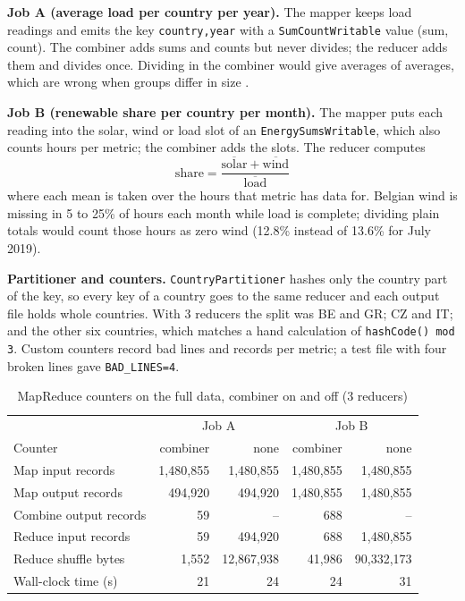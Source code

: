 \documentclass[12pt,a4paper]{report}
\begin{document}
\textbf{Job A (average load per country per year).} The mapper keeps load readings and emits the key \texttt{country,year} with a \texttt{SumCountWritable} value (sum, count). The combiner adds sums and counts but never divides; the reducer adds them and divides once. Dividing in the combiner would give averages of averages, which are wrong when groups differ in size \cite{lin2010}.

\textbf{Job B (renewable share per country per month).} The mapper puts each reading into the solar, wind or load slot of an \texttt{EnergySumsWritable}, which also counts hours per metric; the combiner adds the slots. The reducer computes
\[ \text{share} = \frac{\overline{\text{solar}} + \overline{\text{wind}}}{\overline{\text{load}}} \]
where each mean is taken over the hours that metric has data for. Belgian wind is missing in 5 to 25\% of hours each month while load is complete; dividing plain totals would count those hours as zero wind (12.8\% instead of 13.6\% for July 2019).

\textbf{Partitioner and counters.} \texttt{CountryPartitioner} hashes only the country part of the key, so every key of a country goes to the same reducer and each output file holds whole countries. With 3 reducers the split was BE and GR; CZ and IT; and the other six countries, which matches a hand calculation of \texttt{hashCode() mod 3}. Custom counters record bad lines and records per metric; a test file with four broken lines gave \texttt{BAD\_LINES=4}.

\begin{table}[H]
\centering\small
\caption{MapReduce counters on the full data, combiner on and off (3 reducers)}\label{tab:mr}
\begin{tabular}{lrrrr}
\toprule
& \multicolumn{2}{c}{Job A} & \multicolumn{2}{c}{Job B}\\
Counter & combiner & none & combiner & none\\
\midrule
Map input records & 1,480,855 & 1,480,855 & 1,480,855 & 1,480,855\\
Map output records & 494,920 & 494,920 & 1,480,855 & 1,480,855\\
Combine output records & 59 & -- & 688 & --\\
Reduce input records & 59 & 494,920 & 688 & 1,480,855\\
Reduce shuffle bytes & 1,552 & 12,867,938 & 41,986 & 90,332,173\\
Wall-clock time (s) & 21 & 24 & 24 & 31\\
\bottomrule
\end{tabular}
\end{table}
\end{document}
